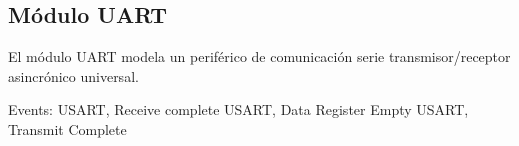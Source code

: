 \subsection{Módulo UART}

El módulo UART modela un periférico de comunicación serie transmisor/receptor asincrónico universal.

Events:
USART, Receive complete
USART, Data Register Empty
USART, Transmit Complete